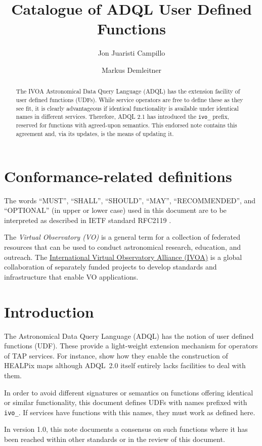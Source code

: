 \documentclass[11pt,a4paper]{ivoa}
\title{Catalogue of ADQL User Defined Functions}
\author[https://wiki.ivoa.net/twiki/bin/view/IVOA/JonJuaristiCampillo]{Jon Juaristi Campillo}
\author[https://wiki.ivoa.net/twiki/bin/view/IVOA/MarkusDemleitner]{Markus Demleitner}
\begin{document}
\begin{abstract}
The IVOA Astronomical Data Query Language (ADQL) has the extension
facility of user defined functions (UDFs).  While service operators are
free to define these as they see fit, it is clearly advantageous if
identical functionality is available under identical names in different
services.  Therefore, ADQL 2.1 has introduced the \verb|ivo_| prefix,
reserved for functions with agreed-upon semantics.  This endorsed note
contains this agreement and, via its updates, is the means of updating
it.
\end{abstract}


\section*{Conformance-related definitions}

The words ``MUST'', ``SHALL'', ``SHOULD'', ``MAY'', ``RECOMMENDED'', and
``OPTIONAL'' (in upper or lower case) used in this document are to be
interpreted as described in IETF standard RFC2119 \citep{std:RFC2119}.

The \emph{Virtual Observatory (VO)} is a
general term for a collection of federated resources that can be used
to conduct astronomical research, education, and outreach.
The \href{http://www.ivoa.net}{International
Virtual Observatory Alliance (IVOA)} is a global
collaboration of separately funded projects to develop standards and
infrastructure that enable VO applications.


\section{Introduction}

The Astronomical Data Query Language (ADQL) \citep{2008ivoa.spec.1030O}
has the notion of user defined functions (UDF).  These provide a
light-weight extension mechanism for operators of TAP services.
For instance, \citet{2016arXiv161109190T} show how they enable the
construction of HEALPix maps although ADQL~2.0 itself entirely lacks
facilities to deal with them.

In order to avoid different signatures or semantics on functions
offering identical or similar functionality,  this document defines UDFs
with names prefixed with \verb|ivo_|.  If services have functions with
this names, they must work as defined here.

In version 1.0, this note documents a consensus
on such functions where it has been
reached within other standards or in the review of this document.
\end{document}
